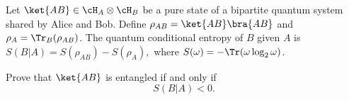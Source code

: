 Let $\ket{AB}\in \cH_A\otimes \cH_B$ be a pure state of a bipartite quantum system shared by Alice and Bob. Define $\rho_{AB}=\ket{AB}\bra{AB}$ and $\rho_A=\Tr_B(\rho_{AB})$.
The quantum conditional entropy of $B$ given $A$ is $S(B|A) = S(\rho_{AB})-S(\rho_A),$
where $S(\omega)=-\Tr(\omega\log_2 \omega)$.

Prove that $\ket{AB}$ is entangled if and only if
$$
S(B|A)<0.
$$
